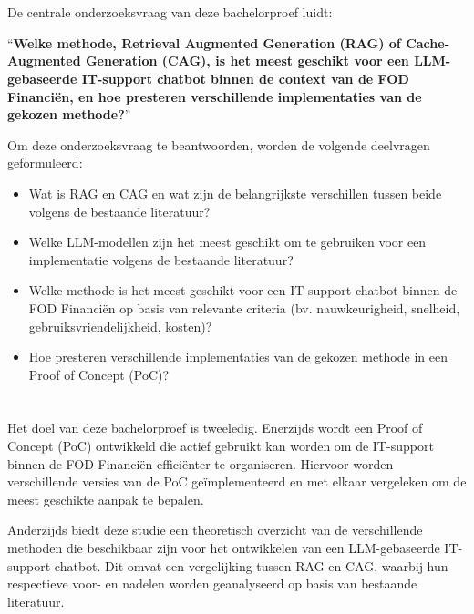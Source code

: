 \section{}%
\label{sec:onderzoeksvraag}

De centrale onderzoeksvraag van deze bachelorproef luidt:

“\textbf{Welke methode, Retrieval Augmented Generation (RAG) of Cache-Augmented Generation (CAG), is het meest geschikt voor een LLM-gebaseerde IT-support chatbot binnen de context van de FOD Financiën, en hoe presteren verschillende implementaties van de gekozen methode?}”

Om deze onderzoeksvraag te beantwoorden, worden de volgende deelvragen geformuleerd:

\begin{itemize}
    \item Wat is RAG en CAG en wat zijn de belangrijkste verschillen tussen beide volgens de bestaande literatuur?
    \item Welke LLM-modellen zijn het meest geschikt om te gebruiken voor een implementatie volgens de bestaande literatuur?
    \item Welke methode is het meest geschikt voor een IT-support chatbot binnen de FOD Financiën op basis van relevante criteria (bv. nauwkeurigheid, snelheid, gebruiksvriendelijkheid, kosten)?
    \item Hoe presteren verschillende implementaties van de gekozen methode in een Proof of Concept (PoC)?
\end{itemize}

\section{}%
\label{sec:onderzoeksdoelstelling}

Het doel van deze bachelorproef is tweeledig. Enerzijds wordt een Proof of Concept (PoC) ontwikkeld die actief gebruikt kan worden om de IT-support binnen de FOD Financiën efficiënter te organiseren. Hiervoor worden verschillende versies van de PoC geïmplementeerd en met elkaar vergeleken om de meest geschikte aanpak te bepalen.

Anderzijds biedt deze studie een theoretisch overzicht van de verschillende methoden die beschikbaar zijn voor het ontwikkelen van een LLM-gebaseerde IT-support chatbot. Dit omvat een vergelijking tussen RAG en CAG, waarbij hun respectieve voor- en nadelen worden geanalyseerd op basis van bestaande literatuur.


